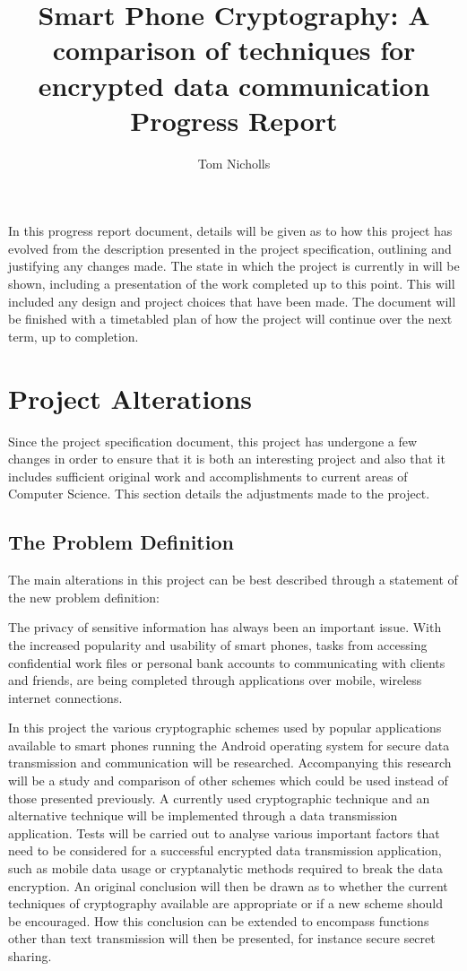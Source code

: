 \documentclass[a4paper,11pt]{article}
\title{Smart Phone Cryptography: A comparison of techniques for encrypted data communication \\ Progress Report}
\author{Tom Nicholls}
\begin{document}
\maketitle

In this progress report document, details will be given as to how this project has evolved from the description presented in the project specification, outlining and justifying any changes made. The state in which the project is currently in will be shown, including a presentation of the work completed up to this point. This will included any design and project choices that have been made. The document will be finished with a timetabled plan of how the project will continue over the next term, up to completion. 

\section{Project Alterations}

Since the project specification document, this project has undergone a few changes in order to ensure that it is both an interesting project and also that it includes sufficient original work and accomplishments to current areas of Computer Science. This section details the adjustments made to the project.

\subsection{The Problem Definition}  

The main alterations in this project can be best described through a statement of the new problem definition:

The privacy of sensitive information has always been an important issue. With the increased popularity and usability of smart phones, tasks from accessing confidential work files or personal bank accounts to communicating with clients and friends, are being completed through applications over mobile, wireless internet connections. 

In this project the various cryptographic schemes used by popular applications available to smart phones running the Android operating system for secure data transmission and communication will be researched. Accompanying this research will be a study and comparison of other schemes which could be used instead of those presented previously. A currently used cryptographic technique and an alternative technique will be implemented through a data transmission application. Tests will be carried out to analyse various important factors that need to be considered for a successful encrypted data transmission application, such as mobile data usage or cryptanalytic methods required to break the data encryption. An original conclusion will then be drawn as to whether the current techniques of cryptography available are appropriate or if a new scheme should be encouraged. How this conclusion can be extended to encompass functions other than text transmission will then be presented, for instance secure secret sharing.
\end{document}
